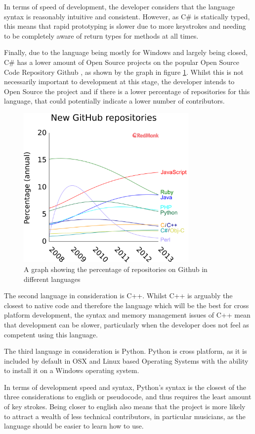 In terms of speed of development, the developer considers that the language syntax is reasonably intuitive and consistent. However, as C\# is statically typed, this means that rapid prototyping is slower due to more keystrokes and needing to be completely aware of return types for methods at all times.

Finally, due to the language being mostly for Windows and largely being closed, C\# has a lower amount of Open Source projects on the popular Open Source Code Repository Github \parencite{Redmonk}, as shown by the graph in figure \ref{fig:graph}. Whilst this is not necessarily important to development at this stage, the developer intends to Open Source the project and if there is a lower percentage of repositories for this language, that could potentially indicate a lower number of contributors.

\begin{figure}[h]
\centering
\includegraphics[width=250pt]{github-repos}
\caption{A graph showing the percentage of repositories on Github in different languages \parencite{Redmonk}}	
\label{fig:graph}
\end{figure}
The second language in consideration is C++. Whilst C++ is arguably the closest to native code and therefore the language which will be the best for cross platform development, the syntax and memory management issues of C++ mean that development can be slower, particularly when the developer does not feel as competent using this language.

The third language in consideration is Python. Python is cross platform, as it is included by default in OSX and Linux based Operating Systems with the ability to install it on a Windows operating system.

In terms of development speed and syntax, Python's syntax is the closest of the three considerations to english or pseudocode, and thus requires the least amount of key strokes. Being closer to english also means that the project is more likely to attract a wealth of less technical contributors, in particular musicians, as the language should be easier to learn how to use.

